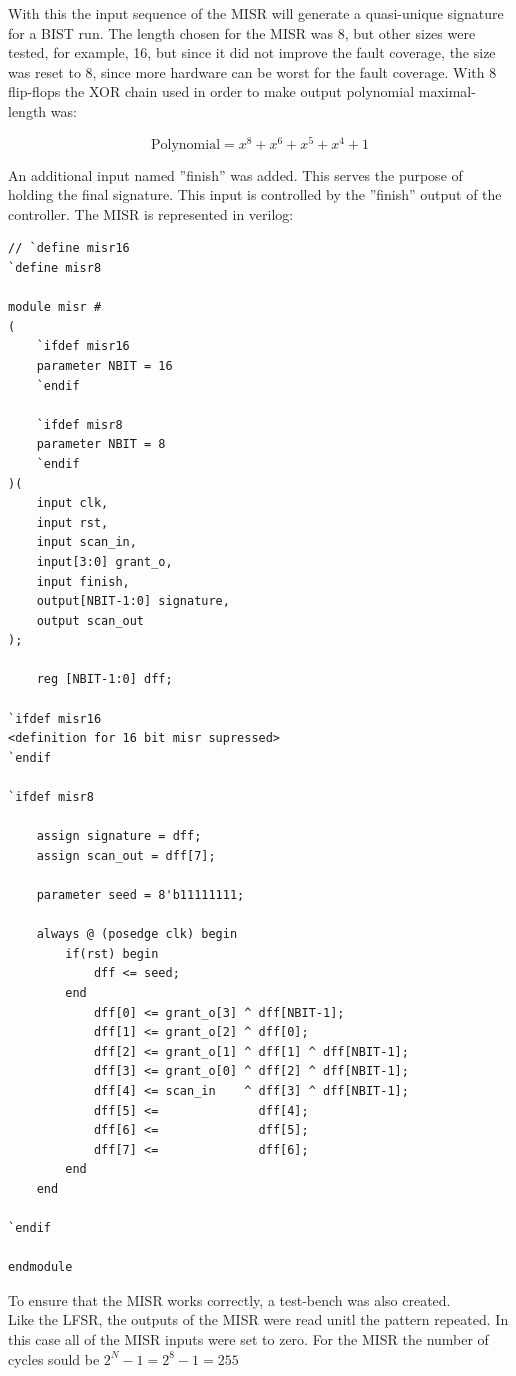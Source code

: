 \documentclass[12pt]{article}
\begin{document}
With this the input sequence of the MISR will generate a quasi-unique signature for a BIST run. The length chosen for the MISR was 8, but other sizes were tested, for example, 16, but since it did not improve the fault coverage, the size was reset to 8, since more hardware can be worst for the fault coverage. With 8 flip-flops the XOR chain used in order to make output polynomial maximal-length was:
    
    \begin{equation}
            \text{Polynomial} = x^{8} + x^{6} + x^{5} + x^{4} + 1 
    \end{equation}   

An additional input named ''finish'' was added. This serves the purpose of holding the final signature. This input is controlled by the ''finish'' output of the controller.
The MISR is represented in verilog:
  
    \begin{lstlisting}[caption={MISR code.},captionpos=b]
// `define misr16
`define misr8

module misr #
(
    `ifdef misr16
    parameter NBIT = 16
    `endif

    `ifdef misr8
    parameter NBIT = 8
    `endif
)(
    input clk,
    input rst,
    input scan_in,
    input[3:0] grant_o,
    input finish,
    output[NBIT-1:0] signature,
    output scan_out
);

    reg [NBIT-1:0] dff;

`ifdef misr16
<definition for 16 bit misr supressed>
`endif

`ifdef misr8

    assign signature = dff;
    assign scan_out = dff[7];

    parameter seed = 8'b11111111;

    always @ (posedge clk) begin
        if(rst) begin
            dff <= seed;
        end
            dff[0] <= grant_o[3] ^ dff[NBIT-1];          
            dff[1] <= grant_o[2] ^ dff[0];
            dff[2] <= grant_o[1] ^ dff[1] ^ dff[NBIT-1];
            dff[3] <= grant_o[0] ^ dff[2] ^ dff[NBIT-1];
            dff[4] <= scan_in    ^ dff[3] ^ dff[NBIT-1];
            dff[5] <=              dff[4];
            dff[6] <=              dff[5];
            dff[7] <=              dff[6];
        end
    end

`endif

endmodule
    \end{lstlisting}
    
    
To ensure that the MISR works correctly, a test-bench was also created.\\ Like the LFSR, the outputs of the MISR were read unitl the pattern repeated. In this case all of the MISR inputs were set to zero. For the MISR the number of cycles sould be $2^{N}-1 = 2^{8}-1= 255$\\
    
\end{document}
